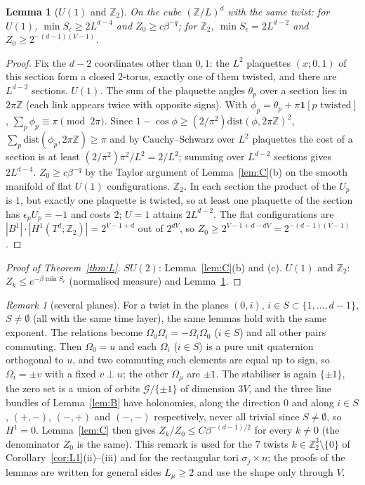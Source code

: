 \documentclass[11pt,a4paper]{article}
\theoremstyle{plain}
\newtheorem{lemma}[theorem]{Lemma}
\theoremstyle{definition}
\theoremstyle{remark}
\newtheorem{remark}[theorem]{Remark}
\numberwithin{equation}{section}
\newcommand{\Z}{\mathbb{Z}}
\begin{document}
\begin{lemma}[$U(1)$ and $\Z_2$]\label{lem:D}
On the cube $(\Z/L)^d$ with the same twist: for $U(1)$, $\min S_\epsilon\ge2L^{d-4}$ and $Z_0\ge c\beta^{-q}$; for $\Z_2$, $\min S_\epsilon=2L^{d-2}$ and $Z_0\ge2^{-(d-1)(V-1)}$.
\end{lemma}
\begin{proof}
Fix the $d-2$ coordinates other than $0,1$: the $L^2$ plaquettes $(x;0,1)$ of this section form a closed $2$-torus, exactly one of them twisted, and there are $L^{d-2}$ sections. \emph{$U(1)$.} The sum of the plaquette angles $\theta_p$ over a section lies in $2\pi\Z$ (each link appears twice with opposite signs). With $\phi_p=\theta_p+\pi\mathbf 1[p\text{ twisted}]$, $\sum_p\phi_p\equiv\pi\pmod{2\pi}$. Since $1-\cos\phi\ge(2/\pi^2)\mathrm{dist}(\phi,2\pi\Z)^2$, $\sum_p\mathrm{dist}(\phi_p,2\pi\Z)\ge\pi$ and by Cauchy--Schwarz over $L^2$ plaquettes the cost of a section is at least $(2/\pi^2)\pi^2/L^2=2/L^2$; summing over $L^{d-2}$ sections gives $2L^{d-4}$. $Z_0\ge c\beta^{-q}$ by the Taylor argument of Lemma~\ref{lem:C}(b) on the smooth manifold of flat $U(1)$ configurations. \emph{$\Z_2$.} In each section the product of the $U_p$ is $1$, but exactly one plaquette is twisted, so at least one plaquette of the section has $\epsilon_pU_p=-1$ and costs $2$; $U=1$ attains $2L^{d-2}$. The flat configurations are $|B^1|\cdot|H^1(T^d;\Z_2)|=2^{V-1+d}$ out of $2^{dV}$, so $Z_0\ge2^{V-1+d-dV}=2^{-(d-1)(V-1)}$.
\end{proof}

\begin{proof}[Proof of Theorem~\ref{thm:L}]
$SU(2)$: Lemma~\ref{lem:C}(b) and (c). $U(1)$ and $\Z_2$: $Z_k\le e^{-\beta\min S_\epsilon}$ (normalised measure) and Lemma~\ref{lem:D}.
\end{proof}

\begin{remark}[several planes]\label{rem:several}
For a twist in the planes $(0,i)$, $i\in S\subset\{1,\dots,d-1\}$, $S\ne\emptyset$ (all with the same time layer), the same lemmas hold with the same exponent. The relations become $\Omega_0\Omega_i=-\Omega_i\Omega_0$ ($i\in S$) and all other pairs commuting. Then $\Omega_0=u$ and each $\Omega_i$ ($i\in S$) is a pure unit quaternion orthogonal to $u$, and two commuting such elements are equal up to sign, so $\Omega_i=\pm v$ with a fixed $v\perp u$; the other $\Omega_\mu$ are $\pm1$. The stabiliser is again $\{\pm1\}$, the zero set is a union of orbits $\mathcal G/\{\pm1\}$ of dimension $3V$, and the three line bundles of Lemma~\ref{lem:B} have holonomies, along the direction $0$ and along $i\in S$, $(+,-)$, $(-,+)$ and $(-,-)$ respectively, never all trivial since $S\ne\emptyset$, so $H^1=0$. Lemma~\ref{lem:C} then gives $Z_k/Z_0\le C\beta^{-(d-1)/2}$ for every $k\ne0$ (the denominator $Z_0$ is the same). This remark is used for the $7$ twists $k\in\Z_2^3\setminus\{0\}$ of Corollary~\ref{cor:L1}(ii)--(iii) and for the rectangular tori $\sigma_j\times n$; the proofs of the lemmas are written for general sides $L_\mu\ge2$ and use the shape only through $V$.
\end{remark}
\end{document}
